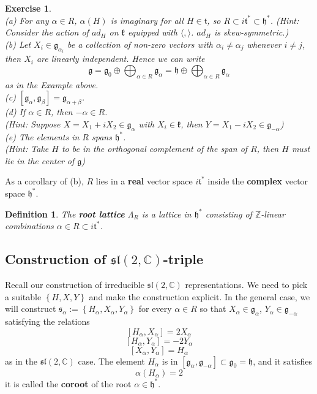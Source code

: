 \documentclass[11pt]{article}
\newtheorem{exercise}[theorem]{Exercise}
\newtheorem{definition}[theorem]{Definition}
\newcommand{\bb}[1]{\mathbb{#1}}
\newcommand{\mf}[1]{\mathfrak{#1}}
\begin{document}
\begin{exercise} \mbox{}\\
(a) For any $\alpha \in R$, $\alpha(H)$ is imaginary for all $H \in \mf{t}$, so $R \subset i\mf{t}^* \subset \mf{h}^*$. (Hint: Consider the action of $ad_H$ on $\mf{k}$ equipped with $\langle, \rangle$. $ad_H$ is skew-symmetric.) \\
(b) Let $X_i \in \mf{g}_{\alpha_i}$ be a collection of non-zero vectors with $\alpha_i \neq \alpha_j$ whenever $i \neq j$, then $X_i$ are linearly independent. Hence we can write
$$\mf{g} = \mf{g}_0 \oplus \bigoplus_{\alpha \in R} \mf{g}_{\alpha} = \mf{h} \oplus \bigoplus_{\alpha \in R} \mf{g}_{\alpha}$$
as in the Example above.\\
(c) $[\mf{g}_{\alpha}, \mf{g}_{\beta}] = \mf{g}_{\alpha + \beta}$.\\
(d) If $\alpha \in R$, then $-\alpha \in R$. \\
(Hint: Suppose $X = X_1 + iX_2 \in \mf{g}_{\alpha}$ with $X_i \in \mf{k}$, then $Y = X_1 - iX_2 \in \mf{g}_{-\alpha}$)\\
(e) The elements in $R$ spans $\mf{h}^*$.\\
(Hint: Take $H$ to be in the orthogonal complement of the span of $R$, then $H$ must lie in the center of $\mf{g}$)
\end{exercise}
As a corollary of (b), $R$ lies in a \textbf{real} vector space $i \mf{t}^*$ inside the \textbf{complex} vector space $\mf{h}^*$.
\begin{definition}
The \textbf{root lattice} $\Lambda_R$ is a lattice in $\mf{h}^*$ consisting of $\bb{Z}$-linear combinations $\alpha \in R \subset i\mf{t}^*$.
\end{definition}


\subsection{Construction of $\mf{sl}(2,\bb{C})$-triple}
Recall our construction of irreducible $\mf{sl}(2,\bb{C})$ representations. We need to pick a suitable $\left\{H, X, Y\right\}$ and make the construction explicit. In the general case, we will construct $\mf{s}_{\alpha} := \left\{H_{\alpha}, X_{\alpha}, Y_{\alpha}\right\}$ for every $\alpha \in R$ so that $X_{\alpha} \in \mf{g}_{\alpha}$, $Y_{\alpha} \in \mf{g}_{-\alpha}$ satisfying the relations
$$[H_{\alpha}, X_{\alpha}] = 2X_{\alpha}$$
$$[H_{\alpha}, Y_{\alpha}] = -2Y_{\alpha}$$
$$[X_{\alpha}, Y_{\alpha}] = H_{\alpha}$$
as in the $\mf{sl}(2,\bb{C})$ case. The element $H_{\alpha}$ is in $[\mf{g}_{\alpha}, \mf{g}_{-\alpha}] \subset \mf{g}_0 = \mf{h}$, and it satisfies
$$\alpha(H_{\alpha}) = 2$$
it is called the \textbf{coroot} of the root $\alpha \in \mf{h}^*$.
\end{document}
